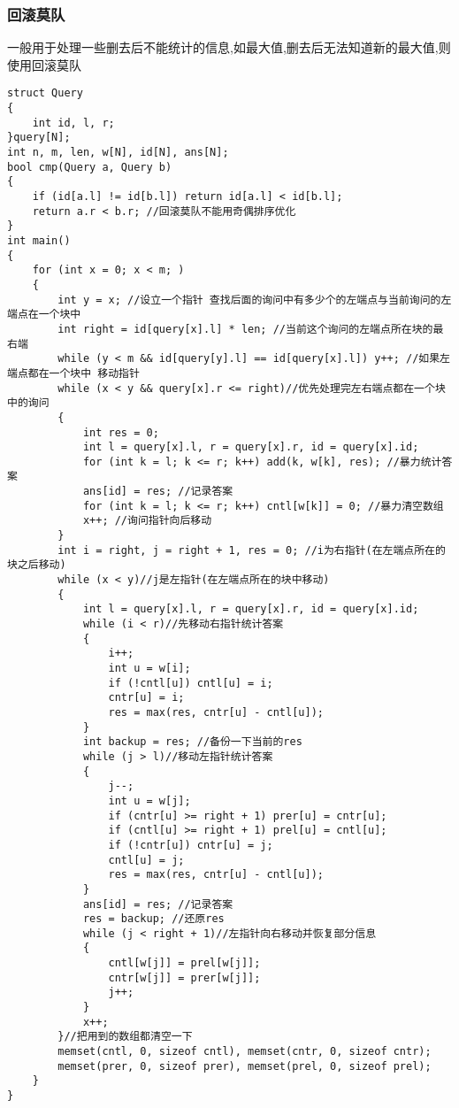 \documentclass[a4paper,fontset=none]{ctexart}
\begin{document}
\subsubsection{回滚莫队}
一般用于处理一些删去后不能统计的信息,如最大值,删去后无法知道新的最大值,则使用回滚莫队
\begin{verbatim}
struct Query
{
    int id, l, r;
}query[N];
int n, m, len, w[N], id[N], ans[N];
bool cmp(Query a, Query b)
{
    if (id[a.l] != id[b.l]) return id[a.l] < id[b.l];
    return a.r < b.r; //回滚莫队不能用奇偶排序优化
}
int main()
{
    for (int x = 0; x < m; )
    {
        int y = x; //设立一个指针 查找后面的询问中有多少个的左端点与当前询问的左端点在一个块中
        int right = id[query[x].l] * len; //当前这个询问的左端点所在块的最右端
        while (y < m && id[query[y].l] == id[query[x].l]) y++; //如果左端点都在一个块中 移动指针
        while (x < y && query[x].r <= right)//优先处理完左右端点都在一个块中的询问
        {
            int res = 0;
            int l = query[x].l, r = query[x].r, id = query[x].id;
            for (int k = l; k <= r; k++) add(k, w[k], res); //暴力统计答案
            ans[id] = res; //记录答案
            for (int k = l; k <= r; k++) cntl[w[k]] = 0; //暴力清空数组
            x++; //询问指针向后移动
        }
        int i = right, j = right + 1, res = 0; //i为右指针(在左端点所在的块之后移动)
        while (x < y)//j是左指针(在左端点所在的块中移动)
        {
            int l = query[x].l, r = query[x].r, id = query[x].id;
            while (i < r)//先移动右指针统计答案
            {
                i++;
                int u = w[i];
                if (!cntl[u]) cntl[u] = i;
                cntr[u] = i;
                res = max(res, cntr[u] - cntl[u]);
            }
            int backup = res; //备份一下当前的res
            while (j > l)//移动左指针统计答案
            {
                j--;
                int u = w[j];
                if (cntr[u] >= right + 1) prer[u] = cntr[u];
                if (cntl[u] >= right + 1) prel[u] = cntl[u];
                if (!cntr[u]) cntr[u] = j;
                cntl[u] = j;
                res = max(res, cntr[u] - cntl[u]);
            }
            ans[id] = res; //记录答案
            res = backup; //还原res
            while (j < right + 1)//左指针向右移动并恢复部分信息
            {
                cntl[w[j]] = prel[w[j]];
                cntr[w[j]] = prer[w[j]];
                j++;
            }
            x++;
        }//把用到的数组都清空一下
        memset(cntl, 0, sizeof cntl), memset(cntr, 0, sizeof cntr);
        memset(prer, 0, sizeof prer), memset(prel, 0, sizeof prel);
    }
}
\end{verbatim}
\end{document}

